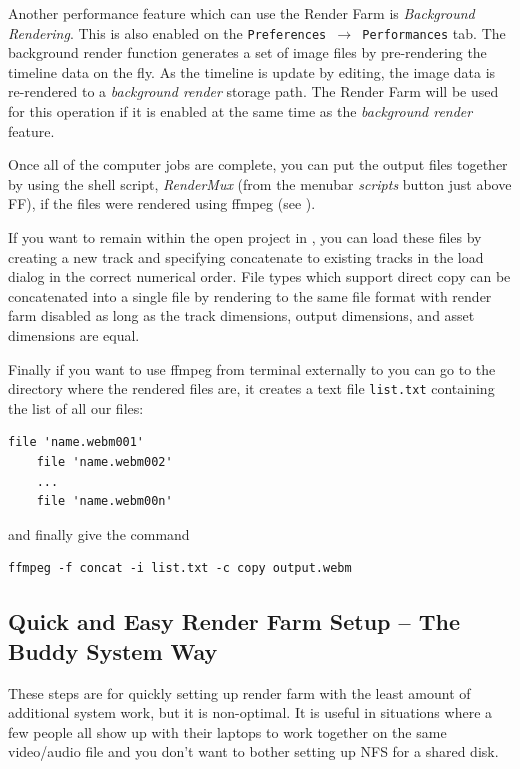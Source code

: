 \begin{description}
  Another performance feature which can use the Render Farm is
  \textit{Background Rendering}.  This is also enabled on the
  \texttt{Preferences $\rightarrow$ Performances} tab.  The background
  render function generates a set of image files by pre-rendering the
  timeline data on the fly.  As the timeline is update by editing, the
  image data is re-rendered to a \textit{background render} storage
  path.  The Render Farm will be used for this operation if it is
  enabled at the same time as the \textit{background render} feature.
\item[Assemble the Output Files] Once all of the computer jobs are
  complete, you can put the output files together by using the shell
  script, \textit{RenderMux} (from the menubar \textit{scripts} button
  just above FF), if the files were rendered using ffmpeg (see ).
  
  If you want to remain within the open project in \CGG{}, you can load these files by creating a new track and specifying concatenate to
  existing tracks in the load dialog in the correct numerical order.
  File types which support direct copy can be concatenated into a
  single file by rendering to the same file format with render farm
  disabled as long as the track dimensions, output dimensions, and
  asset dimensions are equal.
  
  Finally if you want to use ffmpeg from terminal externally to \CGG{} you can go to the directory where the rendered files are, it creates a text file \texttt{list.txt} containing the list of all our files:
  \begin{lstlisting}[style=sh]
  	file 'name.webm001'
  	file 'name.webm002'
  	...
  	file 'name.webm00n'
  \end{lstlisting}
  and finally give the command
  \begin{lstlisting}[style=sh]
  	ffmpeg -f concat -i list.txt -c copy output.webm
  \end{lstlisting}
\end{description}

\subsection{Quick and Easy Render Farm Setup – The Buddy System
  Way}%
\label{sub:buddy_system_way}

These steps are for quickly setting up render farm with the least
amount of additional system work, but it is non-optimal.  It is
useful in situations where a few people all show up with their
laptops to work together on the same video/audio file and you don’t
want to bother setting up NFS for a shared disk.

